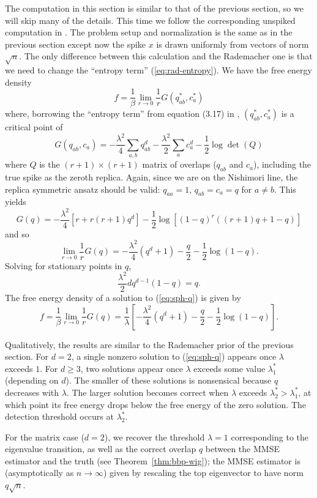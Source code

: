 \documentclass{article}
\begin{document}
The computation in this section is similar to that of the previous section, so we will skip many of the details. This time we follow the corresponding unspiked computation in \cite{cs92}. The problem setup and normalization is the same as in the previous section except now the spike $x$ is drawn uniformly from vectors of norm $\sqrt{n}$. The only difference between this calculation and the Rademacher one is that we need to change the ``entropy term'' (\ref{eq:rad-entropy}). We have the free energy density
$$f = \frac{1}{\beta} \lim_{r \to 0} \frac{1}{r} G(q_{ab}^*,c_a^*)$$
where, borrowing the ``entropy term'' from equation (3.17) in \cite{cs92}, $(q_{ab}^*,c_a^*)$ is a critical point of
$$G(q_{ab},c_a) = -\frac{\lambda^2}{4}\sum_{a,b} q_{ab}^d - \frac{\lambda^2}{2} \sum_a c_a^d - \frac{1}{2}\log \det(Q)$$
where $Q$ is the $(r+1)\times (r+1)$ matrix of overlaps ($q_{ab}$ and $c_a$), including the true spike as the zeroth replica. Again, since we are on the Nishimori line, the replica symmetric ansatz should be valid: $q_{aa} = 1$, $q_{ab} = c_a = q$ for $a \ne b$. This yields
$$G(q) = -\frac{\lambda^2}{4} [r + r(r+1)q^d] - \frac{1}{2}\log[(1-q)^r((r+1)q+1-q)]$$
and so
$$\lim_{r \to 0} \frac{1}{r} G(q) = -\frac{\lambda^2}{4} (q^d + 1) - \frac{q}{2} - \frac{1}{2} \log(1-q).$$
Solving for stationary points in $q$,
\begin{equation}
\label{eq:sph-q}
\frac{\lambda^2}{2} d q^{d-1}(1-q) = q.
\end{equation}
The free energy density of a solution to (\ref{eq:sph-q}) is given by
$$f = \frac{1}{\beta} \lim_{r \to 0} \frac{1}{r} G(q) = \frac{1}{\lambda}\left[-\frac{\lambda^2}{4} (q^d + 1) - \frac{q}{2} - \frac{1}{2} \log(1-q)\right].$$

Qualitatively, the results are similar to the Rademacher prior of the previous section. For $d = 2$, a single nonzero solution to (\ref{eq:sph-q}) appears once $\lambda$ exceeds $1$. For $d \ge 3$, two solutions appear once $\lambda$ exceeds some value $\lambda_1^*$ (depending on $d$). The smaller of these solutions is nonsensical because $q$ decreases with $\lambda$. The larger solution becomes correct when $\lambda$ exceeds $\lambda_2^* > \lambda_1^*$, at which point its free energy drops below the free energy of the zero solution. The detection threshold occurs at $\lambda_2^*$.

For the matrix case ($d=2$), we recover the threshold $\lambda=1$ corresponding to the eigenvalue transition, as well as the correct overlap $q$ between the MMSE estimator and the truth (see Theorem~\ref{thm:bbp-wig}); the MMSE estimator is (asymptotically as $n\to\infty$) given by rescaling the top eigenvector to have norm $q \sqrt{n}$.
\end{document}
